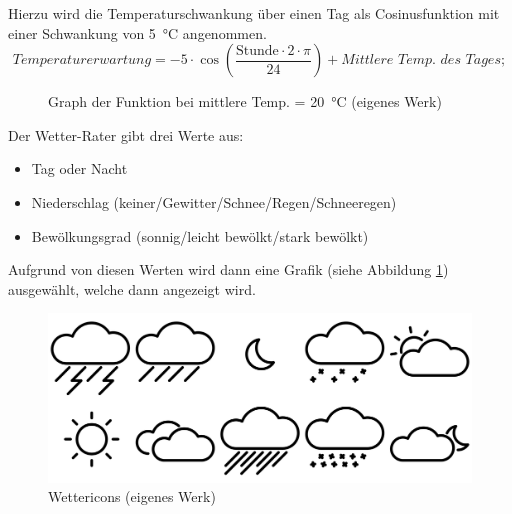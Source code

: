 Hierzu wird die Temperaturschwankung über einen Tag als Cosinusfunktion mit einer Schwankung von \SI{5}{\degreeCelsius} angenommen.
$$ \textit{Temperaturerwartung} = -5 \cdot \cos\left(\frac{\text{Stunde}\cdot 2 \cdot \pi }{24}\right) + \textit{Mittlere Temp. des Tages}; $$
\begin{figure}[h]
\centering
{}
\caption{Graph der Funktion bei mittlere Temp. = \SI{20}{\degreeCelsius} (eigenes Werk)}
\end{figure}


Der Wetter-Rater gibt drei Werte aus:
\begin{itemize}
	\item Tag oder Nacht
	\item Niederschlag (keiner/Gewitter/Schnee/Regen/Schneeregen)
	\item Bewölkungsgrad (sonnig/leicht bewölkt/stark bewölkt)
\end{itemize}
Aufgrund von diesen Werten wird dann eine Grafik (siehe Abbildung \ref{fig:wettericons}) ausgewählt, welche dann angezeigt wird.

\begin{figure}
  \centering
     \includegraphics[width=\textwidth]{figures/wettericons.png}
  \caption{Wettericons (eigenes Werk)}
  \label{fig:wettericons}
\end{figure}

